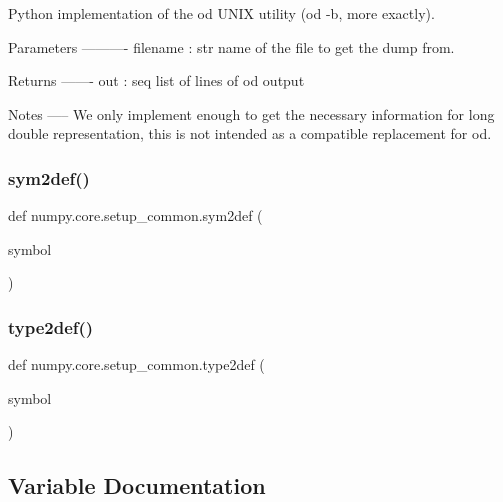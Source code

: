 \begin{DoxyVerb}Python implementation of the od UNIX utility (od -b, more exactly).

Parameters
----------
filename : str
    name of the file to get the dump from.

Returns
-------
out : seq
    list of lines of od output

Notes
-----
We only implement enough to get the necessary information for long double
representation, this is not intended as a compatible replacement for od.
\end{DoxyVerb}
 \mbox{\label{namespacenumpy_1_1core_1_1setup__common_a4679f39e39e2f5f7dfccc5acfeb29313}} 
\subsubsection{\texorpdfstring{sym2def()}{sym2def()}}
{\footnotesize\ttfamily def numpy.\+core.\+setup\+\_\+common.\+sym2def (\begin{DoxyParamCaption}\item[{}]{symbol }\end{DoxyParamCaption})}

\mbox{\label{namespacenumpy_1_1core_1_1setup__common_aaed884223683ee5875348bccaded9ade}} 
\subsubsection{\texorpdfstring{type2def()}{type2def()}}
{\footnotesize\ttfamily def numpy.\+core.\+setup\+\_\+common.\+type2def (\begin{DoxyParamCaption}\item[{}]{symbol }\end{DoxyParamCaption})}



\subsection{Variable Documentation}
\mbox{\label{namespacenumpy_1_1core_1_1setup__common_a9ee8651600584fe92dc9699257b12601}} 
